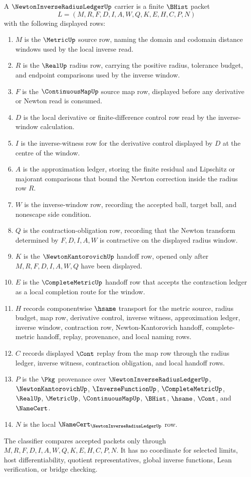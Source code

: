 \begin{definition}
\label{def:newton-inverse-radius-ledger-carrier}
A $\NewtonInverseRadiusLedgerUp$ carrier is a finite $\BHist$ packet
$$
L=(M,R,F,D,I,A,W,Q,K,E,H,C,P,N)
$$
with the following displayed rows:
\begin{enumerate}
\item $M$ is the $\MetricUp$ source row, naming the domain and codomain distance windows used by the local inverse read.
\item $R$ is the $\RealUp$ radius row, carrying the positive radius, tolerance budget, and endpoint comparisons used by the inverse window.
\item $F$ is the $\ContinuousMapUp$ source map row, displayed before any derivative or Newton read is consumed.
\item $D$ is the local derivative or finite-difference control row read by the inverse-window calculation.
\item $I$ is the inverse-witness row for the derivative control displayed by $D$ at the centre of the window.
\item $A$ is the approximation ledger, storing the finite residual and Lipschitz or majorant comparisons that bound the Newton correction inside the radius row $R$.
\item $W$ is the inverse-window row, recording the accepted ball, target ball, and nonescape side condition.
\item $Q$ is the contraction-obligation row, recording that the Newton transform determined by $F,D,I,A,W$ is contractive on the displayed radius window.
\item $K$ is the $\NewtonKantorovichUp$ handoff row, opened only after $M,R,F,D,I,A,W,Q$ have been displayed.
\item $E$ is the $\CompleteMetricUp$ handoff row that accepts the contraction ledger as a local completion route for the window.
\item $H$ records componentwise $\hsame$ transport for the metric source, radius budget, map row, derivative control, inverse witness, approximation ledger, inverse window, contraction row, Newton-Kantorovich handoff, complete-metric handoff, replay, provenance, and local naming rows.
\item $C$ records displayed $\Cont$ replay from the map row through the radius ledger, inverse witness, contraction obligation, and local handoff rows.
\item $P$ is the $\Pkg$ provenance over $\NewtonInverseRadiusLedgerUp$, $\NewtonKantorovichUp$, $\InverseFunctionUp$, $\CompleteMetricUp$, $\RealUp$, $\MetricUp$, $\ContinuousMapUp$, $\BHist$, $\hsame$, $\Cont$, and $\NameCert$.
\item $N$ is the local $\NameCert_{\NewtonInverseRadiusLedgerUp}$ row.
\end{enumerate}
The classifier compares accepted packets only through $M,R,F,D,I,A,W,Q,K,E,H,C,P,N$. It has no coordinate for selected limits, host differentiability, quotient representatives, global inverse functions, Lean verification, or bridge checking.
\end{definition}

